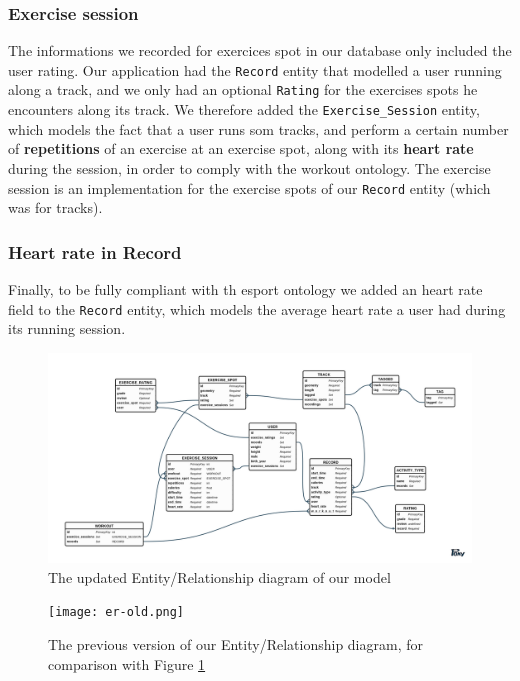 \documentclass[a4paper]{article}
\begin{document}
\subsubsection{Exercise session}
The informations we recorded for exercices spot in our database only included the user rating. Our application had the \texttt{Record} entity that modelled a user running along a track, and we only had an optional \texttt{Rating} for the exercises spots he encounters along its track. We therefore added the \texttt{Exercise\_Session} entity, which models the fact that a user runs som tracks, and perform a certain number of \textbf{repetitions} of an exercise at an exercise spot, along with its \textbf{heart rate} during the session, in order to comply with the workout ontology. The exercise session is an implementation for the exercise spots of our \texttt{Record} entity (which was for tracks).

\subsubsection{Heart rate in Record}
Finally, to be fully compliant with th esport ontology we added an heart rate field to the \texttt{Record} entity, which models the average heart rate a user had during its running session.


\begin{figure}
  \center
  \includegraphics[width=\textwidth]{er.png}
  \caption{\label{fig:new-er} The updated Entity/Relationship diagram of our model}
\end{figure}

\begin{figure}[h!]
  \center
  \texttt{[image: er-old.png]}
  \caption{\label{fig:old-er} The previous version of our Entity/Relationship diagram, for comparison with Figure \ref{fig:new-er}}
\end{figure}
\end{document}
